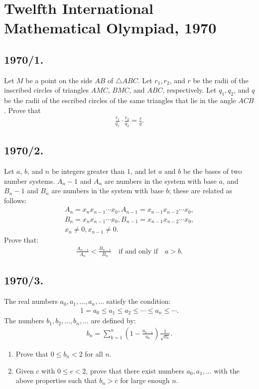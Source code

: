 \documentclass{article}
\begin{document}
\section*{Twelfth International Mathematical Olympiad, 1970}

\subsection*{1970/1.}
Let $M$ be a point on the side $AB$ of $\triangle ABC$. Let $r_1, r_2$, and $r$ be the radii of the inscribed circles of triangles $AMC$, $BMC$, and $ABC$, respectively. Let $q_1, q_2$, and $q$ be the radii of the escribed circles of the same triangles that lie in the angle $ACB$. Prove that
\begin{align}
    \frac{r_1}{q_1} \cdot \frac{r_2}{q_2} = \frac{r}{q}.
\end{align}

\subsection*{1970/2.}
Let $a$, $b$, and $n$ be integers greater than $1$, and let $a$ and $b$ be the bases of two number systems. $A_n-1$ and $A_n$ are numbers in the system with base $a$, and $B_n-1$ and $B_n$ are numbers in the system with base $b$; these are related as follows:
\begin{align}
    A_n = x_n x_{n-1} \cdots x_0,  A_{n-1} = x_{n-1} x_{n-2} \cdots x_0,\\
    B_n = x_n x_{n-1} \cdots x_0,  B_{n-1} = x_{n-1} x_{n-2} \cdots x_0,\\
     x_n \neq 0,x_{n-1} \neq 0 .
\end{align}
\noindent Prove that:
\begin{align}
    \frac{A_{n-1}}{A_n} < \frac{B_{n-1}}{B_n} \quad \text{if and only if} \quad a > b.
\end{align}

\subsection*{1970/3.}
The real numbers $a_0, a_1, \dots, a_n, \dots$ satisfy the condition:
\begin{align}
    1 = a_0 \leq a_1 \leq a_2 \leq \cdots \leq a_n \leq \cdots.
\end{align}
The numbers $b_1, b_2, \dots, b_n, \dots$ are defined by:
\begin{align}
    b_n = \sum_{k=1}^{n} \left( 1 - \frac{a_{k-1}}{a_k} \right) \frac{1}{\sqrt{a_k}}.
\end{align}
\begin{enumerate}
    \item Prove that $0 \leq b_n < 2$ for all $n$.
    \item Given $c$ with $0 \leq c < 2$, prove that there exist numbers $a_0, a_1, \dots$ with the above properties such that $b_n > c$ for large enough $n$.
\end{enumerate}
\end{document}
